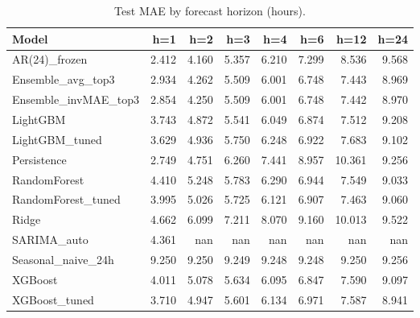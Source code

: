 \begin{table}[t]
\centering
\small
\caption{Test MAE by forecast horizon (hours).}
\label{tab:mae_horizon}
\begin{tabular}{lrrrrrrr}
\toprule
Model & h=1 & h=2 & h=3 & h=4 & h=6 & h=12 & h=24 \\
\midrule
AR(24)\_frozen & 2.412 & 4.160 & 5.357 & 6.210 & 7.299 & 8.536 & 9.568 \\
Ensemble\_avg\_top3 & 2.934 & 4.262 & 5.509 & 6.001 & 6.748 & 7.443 & 8.969 \\
Ensemble\_invMAE\_top3 & 2.854 & 4.250 & 5.509 & 6.001 & 6.748 & 7.442 & 8.970 \\
LightGBM & 3.743 & 4.872 & 5.541 & 6.049 & 6.874 & 7.512 & 9.208 \\
LightGBM\_tuned & 3.629 & 4.936 & 5.750 & 6.248 & 6.922 & 7.683 & 9.102 \\
Persistence & 2.749 & 4.751 & 6.260 & 7.441 & 8.957 & 10.361 & 9.256 \\
RandomForest & 4.410 & 5.248 & 5.783 & 6.290 & 6.944 & 7.549 & 9.033 \\
RandomForest\_tuned & 3.995 & 5.026 & 5.725 & 6.121 & 6.907 & 7.463 & 9.060 \\
Ridge & 4.662 & 6.099 & 7.211 & 8.070 & 9.160 & 10.013 & 9.522 \\
SARIMA\_auto & 4.361 & nan & nan & nan & nan & nan & nan \\
Seasonal\_naive\_24h & 9.250 & 9.250 & 9.249 & 9.248 & 9.248 & 9.250 & 9.256 \\
XGBoost & 4.011 & 5.078 & 5.634 & 6.095 & 6.847 & 7.590 & 9.097 \\
XGBoost\_tuned & 3.710 & 4.947 & 5.601 & 6.134 & 6.971 & 7.587 & 8.941 \\
\bottomrule
\end{tabular}
\end{table}

